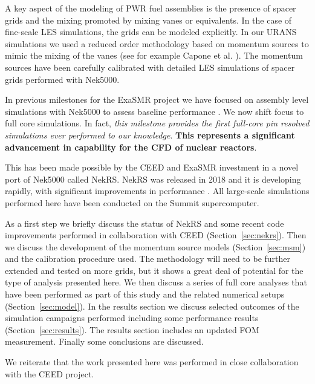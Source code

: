 \documentclass{ecpreportv2}
\begin{document}
A key aspect of the modeling of PWR fuel assemblies is the presence of spacer grids and the mixing promoted by mixing vanes or equivalents. In the case of fine-scale LES simulations, the grids can be modeled explicitly. In our URANS simulations we used a reduced order methodology based on momentum sources to mimic the mixing of the vanes (see for example Capone et al. \cite{Capone2016}). The momentum sources have been carefully calibrated with detailed LES simulations of spacer grids performed with Nek5000.

In previous milestones for the ExaSMR project we have focused on assembly level simulations with Nek5000 to assess baseline performance \cite{merzari2018performance} \cite{merzari2020wall}. We now shift focus to full core simulations. In fact, \textit{this milestone provides the first full-core pin resolved simulations ever performed to our knowledge}. \textbf{This represents a significant advancement in capability for the CFD of nuclear reactors}.

This has been made possible by the CEED and ExaSMR investment in a novel port of Nek5000 called NekRS. NekRS was released in 2018 and it is developing rapidly, with significant improvements in performance \cite{merzari2020toward}. All large-scale simulations performed here have been conducted on the Summit supercomputer.

As a first step we briefly discuss the status of NekRS and some recent code improvements performed in collaboration with CEED (Section~\ref{sec:nekrs}).   Then we discuss the development of the momentum source models (Section~\ref{sec:msm}) and the calibration procedure used. The methodology will need to be further extended and tested on more grids, but it shows a great deal of potential for the type of analysis presented here. We then discuss a series of full core analyses that have been performed as part of this study and the related numerical setups (Section~\ref{sec:model}). In the results section we discuss selected outcomes of the simulation campaigns performed including some performance results (Section~\ref{sec:results}). The results section includes an updated FOM measurement. Finally some conclusions are discussed.

We reiterate  that the work presented here was performed in close collaboration with the CEED project.







\end{document}
